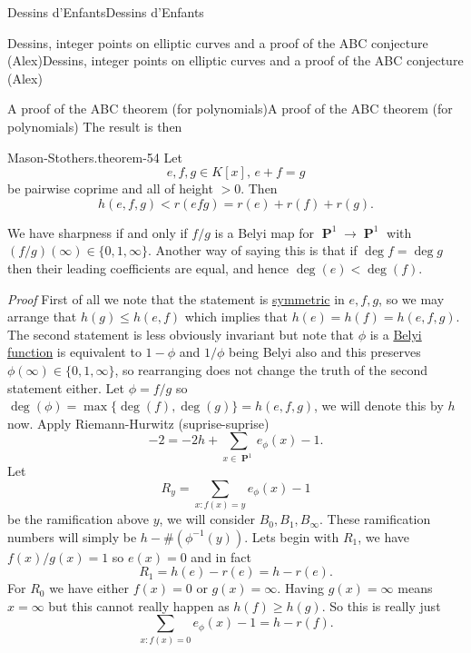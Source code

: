 \documentclass[10pt,]{book}
\makeatletter
\renewcommand*{\proofname}{Proof}
\renewenvironment{proof}[1][\proofname]{\par
  \pushQED{\qed}%
  \normalfont \topsep6\p@\@plus6\p@\relax
  \trivlist
  \item\relax
    {\itshape
    #1\@addpunct{.}}\hspace\labelsep\ignorespaces
}{%
  \popQED\endtrivlist\@endpefalse
}
\numberwithin{equation}{section}
\newcommand{\inv}{^{-1}}
\DeclareMathOperator{\PP}{\mathbf{P}}
\newcommand{\lt}{<}
\newcommand{\gt}{>}
\makeatother
\begin{document}
\begin{chapterptx}{Dessins d'Enfants}{}{Dessins d'Enfants}{}{}
\begin{sectionptx}{Dessins, integer points on elliptic curves and a proof of the ABC conjecture (Alex)}{}{Dessins, integer points on elliptic curves and a proof of the ABC conjecture (Alex)}{}{}
\begin{subsectionptx}{A proof of the ABC theorem (for polynomials)}{}{A proof of the ABC theorem (for polynomials)}{}{}
\hypertarget{p-700}{}%
The result is then%
\begin{theorem}{Mason-Stothers.}{}{theorem-54}%
\hypertarget{p-701}{}%
Let%
\begin{equation*}
e,f,g\in K[x],\,e + f = g
\end{equation*}
be pairwise coprime and all of height \(\gt 0\). Then%
\begin{equation*}
h(e,f,g) \lt r(efg) = r(e) + r(f)  + r(g)\text{.}
\end{equation*}
%
\par
\hypertarget{p-702}{}%
We have sharpness if and only if \(f/g\) is a Belyi map for \(\PP^1 \to \PP^1\) with \((f/g)(\infty) \in \{0,1,\infty\}\). Another way of saying this is that if \(\deg f = \deg g\) then their leading coefficients are equal, and hence \(\deg (e) \lt \deg (f)\).%
\end{theorem}
\begin{proof}\hypertarget{proof-100}{}
\hypertarget{p-703}{}%
First of all we note that the statement is \hyperref[def-princ-pol]{symmetric} in \(e,f,g\), so we may arrange that \(h(g) \le h(e,f)\) which implies that \(h(e) = h(f) = h(e,f,g)\). The second statement is less obviously invariant but note that \(\phi\) is  a \hyperref[def-belyi-function]{Belyi function} is equivalent to \(1-\phi\) and \(1/\phi\) being Belyi also and this preserves \(\phi(\infty) \in \{0,1,\infty\}\), so rearranging does not change the truth of the second statement either. Let \(\phi = f/g\) so \(\deg(\phi) = \max\{\deg (f), \deg(g)\} = h(e,f,g)\), we will denote this by \(h\) now. Apply Riemann-Hurwitz (suprise-suprise)%
\begin{equation*}
-2 = -2h + \sum_{x\in \PP^1} e_\phi(x) - 1\text{.}
\end{equation*}
Let%
\begin{equation*}
R_y = \sum_{x : f(x) = y} e_\phi(x) - 1
\end{equation*}
be the ramification above \(y\), we will consider \(B_0, B_1, B_\infty\). These ramification numbers will simply be \(h - \#(\phi\inv(y))\). Lets begin with \(R_1\), we have \(f(x)/g(x) = 1\) so \(e(x) = 0\) and in fact%
\begin{equation*}
R_1 = h(e) - r(e) = h - r(e)\text{.}
\end{equation*}
For \(R_0\) we have either \(f(x) = 0\) or \(g(x) = \infty\). Having \(g(x) = \infty\) means \(x = \infty\) but this cannot really happen as \(h(f) \ge h(g)\). So this is really just%
\begin{equation*}
\sum_{x : f(x) = 0} e_\phi(x) - 1 = h  - r(f)\text{.}

\end{equation*}
\end{proof}
\end{subsectionptx}
\end{sectionptx}
\end{chapterptx}
\end{document}
